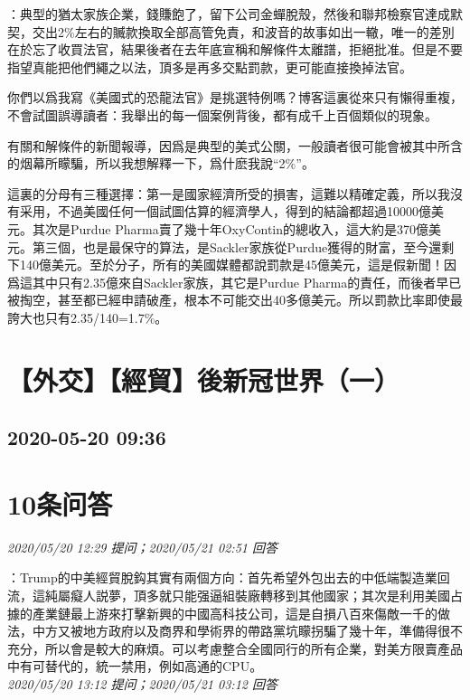 \documentclass[twocolumn]{ctexart}
\begin{document}
：典型的猶太家族企業，錢賺飽了，留下公司金蟬脫殼，然後和聯邦檢察官達成默契，交出2\%左右的贓款換取全部高管免責，和波音的故事如出一轍，唯一的差別在於忘了收買法官，結果後者在去年底宣稱和解條件太離譜，拒絕批准。但是不要指望真能把他們繩之以法，頂多是再多交點罰款，更可能直接換掉法官。

你們以爲我寫《美國式的恐龍法官》是挑選特例嗎？博客這裏從來只有懶得重複，不會試圖誤導讀者：我舉出的每一個案例背後，都有成千上百個類似的現象。


有關和解條件的新聞報導，因爲是典型的美式公關，一般讀者很可能會被其中所含的烟幕所矇騙，所以我想解釋一下，爲什麽我說“2\%”。

這裏的分母有三種選擇：第一是國家經濟所受的損害，這難以精確定義，所以我沒有采用，不過美國任何一個試圖估算的經濟學人，得到的結論都超過10000億美元。其次是Purdue Pharma賣了幾十年OxyContin的總收入，這大約是370億美元。第三個，也是最保守的算法，是Sackler家族從Purdue獲得的財富，至今還剩下140億美元。至於分子，所有的美國媒體都說罰款是45億美元，這是假新聞！因爲這其中只有2.35億來自Sackler家族，其它是Purdue Pharma的責任，而後者早已被掏空，甚至都已經申請破產，根本不可能交出40多億美元。所以罰款比率即使最誇大也只有2.35/140=1.7\%。
\\


\section{【外交】【經貿】後新冠世界（一）}
\subsection{2020-05-20 09:36}


\section{10条问答}

\textit{\hfill\noindent\small 2020/05/20 12:29 提问；2020/05/21 02:51 回答}

：Trump的中美經貿脫鈎其實有兩個方向：首先希望外包出去的中低端製造業回流，這純屬癡人説夢，頂多就只能强逼組裝廠轉移到其他國家；其次是利用美國占據的產業鏈最上游來打擊新興的中國高科技公司，這是自損八百來傷敵一千的做法，中方又被地方政府以及商界和學術界的帶路黨坑矇拐騙了幾十年，準備得很不充分，所以會是較大的麻煩。可以考慮整合全國同行的所有企業，對美方限賣產品中有可替代的，統一禁用，例如高通的CPU。
\\

\textit{\hfill\noindent\small 2020/05/20 13:12 提问；2020/05/21 03:12 回答}
\end{document}
